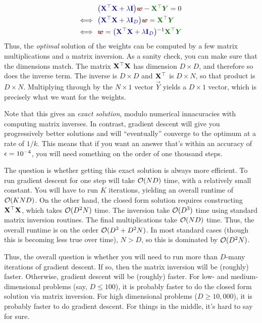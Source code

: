 %
\begin{align}
     & \textcolor{darkblue}{\left( \mat X \T \mat X + \la \eye \right)} \textcolor{darkred}{\vw} - \textcolor{darkergreen}{\mat X \T \vec Y} = 0\\
\myiff~~ & \textcolor{darkblue}{\left( \mat X \T \mat X + \la \eye_D \right)} \textcolor{darkred}{\vw} = \textcolor{darkergreen}{\mat X \T \vec Y} \\
\myiff~~ & \textcolor{darkred}{\vw} = \textcolor{darkblue}{\left( \mat X \T \mat X + \la \eye_D \right)}\inv \textcolor{darkergreen}{\mat X \T \vec Y}
\end{align}
%
Thus, the \emph{optimal} solution of the weights can be computed by a
few matrix multiplications and a matrix inversion.
%
As a sanity check, you can make sure that the dimensions match.  The
matrix $\text{\bf X}{}^\top\text{\bf X}$ has dimension $D\times D$, and therefore so
does the inverse term.  The inverse is $D\times D$ and $\text{\bf X}{}^\top$ is
$D\times N$, so that product is $D\times N$.  Multiplying through by
the $N\times 1$ vector $\vec Y$ yields a $D \times 1$ vector, which is
precisely what we want for the weights.


Note that this gives an \emph{exact solution}, modulo numerical
innacuracies with computing matrix inverses.  In contrast, gradient
descent will give you progressively better solutions and will
``eventually'' converge to the optimum at a rate of $1/k$.  This means
that if you want an answer that's within an accuracy of $\epsilon =
10^{-4}$, you will need something on the order of one thousand steps.

The question is whether getting this exact solution is always more
efficient.  To run gradient descent for one step will take $\mathcal{O}(ND)$
time, with a relatively small constant.  You will have to run $K$
iterations, yielding an overall runtime of $\mathcal{O}(KND)$.  On the other
hand, the closed form solution requires constructing $\text{\bf X}{}^\top\text{\bf X}$,
which takes $\mathcal{O}(D^2 N)$ time.  The inversion take $\mathcal{O}(D^3)$ time
using standard matrix inversion routines.  The final multiplications
take $\mathcal{O}(ND)$ time.  Thus, the overall runtime is on the order
$\mathcal{O}(D^3 + D^2 N)$.  In most standard cases (though this is becoming
less true over time), $N > D$, so this is dominated by $\mathcal{O}(D^2 N)$.

Thus, the overall question is whether you will need to run more than
$D$-many iterations of gradient descent.  If so, then the matrix
inversion will be (roughly) faster.  Otherwise, gradient descent will
be (roughly) faster.  For low- and medium-dimensional problems (say,
$D \leq 100$), it is probably faster to do the closed form solution
via matrix inversion.  For high dimensional problems ($D \geq
10,000$), it is probably faster to do gradient descent.  For things in
the middle, it's hard to say for sure.

